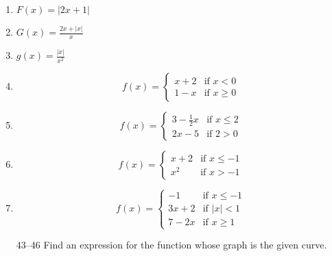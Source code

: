 \documentclass{article}
\begin{document}
\begin{enumerate}
		\item $F(x) = | 2x + 1 |$

		\item $G(x) = \frac{2x + |x|}{x}$

		\item $g(x) = \frac{ |x| }{x^2}$

		\item  

\begin{displaymath}
   f(x) = \left\{
     \begin{array}{lr}
       x + 2 & \text{if } x < 0\\
       1 - x &  \text{if } x \geq 0 
     \end{array}
   \right.
\end{displaymath} 

		\item

\begin{displaymath}
   f(x) = \left\{
     \begin{array}{lr}
       3 - \frac{1}{2}x & \text{if } x \leq 2\\
       2x - 5 &  \text{if } 2 > 0 
     \end{array}
   \right.
\end{displaymath} 

		\item

\begin{displaymath}
   f(x) = \left\{
     \begin{array}{lr}
       x + 2 & \text{if } x \leq -1\\
       x^2 &  \text{if } x > -1 
     \end{array}
   \right.
\end{displaymath} 

		\item

\begin{displaymath}
   f(x) = \left\{
     \begin{array}{lr}
       -1 & \text{if } x \leq -1\\
       3x + 2 &  \text{if } |x| < 1\\
       7 - 2x  & \text{if } x \geq 1
     \end{array}
   \right.
\end{displaymath} 

	\item[43--46] Find an expression for the function whose graph is
		the given curve.
		

\end{enumerate}
\end{document}
